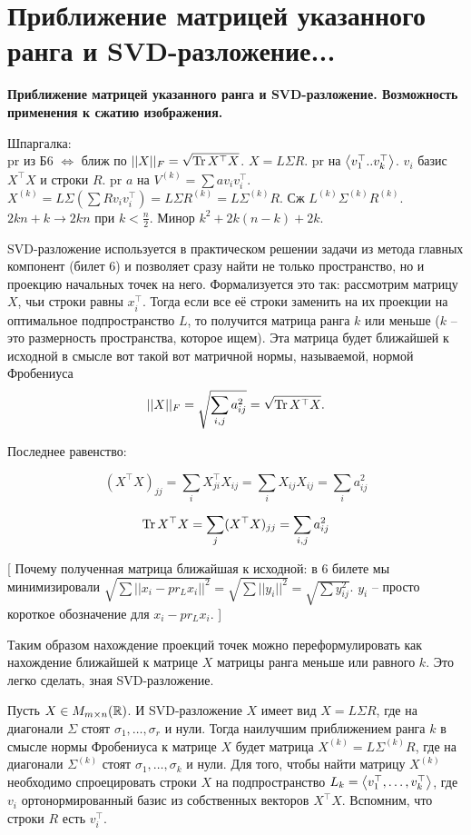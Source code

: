 \section{
 Приближение матрицей указанного ранга и SVD-разложение...
}

\textbf{Приближение матрицей указанного ранга и SVD-разложение. Возможность применения к сжатию изображения.}

Шпаргалка:\\
pr из Б6 $\Leftrightarrow$ ближ по $||X||_F = \sqrt{\operatorname{Tr} X^{\top}X}$. $X = L\Sigma R$. pr на $\left\langle v_1^{\top}..v_k^{\top} \right\rangle$. $v_i$ базис $X^{\top}X$ и строки $R$. pr $a$ на $V^{(k)} = \sum av_iv_i^{\top}$. $X^{(k)} = L\Sigma(\sum Rv_iv_i^{\top}) = L\Sigma R^{(k)} = L\Sigma^{(k)}R$. Сж $L^{(k)}\Sigma^{(k)}R^{(k)}$. $2kn +k \to 2kn$ при $k < \frac{n}{2}$. Минор $k^2 + 2k(n-k) + 2k$.

SVD-разложение используется в практическом решении задачи из метода главных компонент (билет 6) и позволяет сразу найти не только пространство, но и проекцию начальных точек на него. Формализуется это так: рассмотрим матрицу $X$, чьи строки равны $x_i^{\top}$. Тогда если все её строки заменить на их проекции на оптимальное подпространство $L$, то получится матрица ранга $k$ или меньше ($k$ -- это размерность пространства, которое ищем). Эта матрица будет ближайшей к исходной в смысле вот такой вот матричной нормы, называемой, нормой Фробениуса 
$$||X||_F=\sqrt{\sum_{i,j} a_{ij}^2}=\sqrt{\operatorname{Tr} X^{\top}X}.$$

Последнее равенство:

$$(X^{\top}X)_{jj} = \sum\limits_{i} X^{\top}_{ji}X_{ij} = \sum\limits_{i} X_{ij}X_{ij} = \sum\limits_{i} a_{ij}^2$$

$$\operatorname{Tr} X^{\top}X = \sum\limits_{j} (X^{\top}X)_{jj} = \sum\limits_{i,j} a_{ij}^2$$

[ Почему полученная матрица ближайшая к исходной: в 6 билете мы минимизировали $\sqrt{\sum ||x_i - pr_{L}x_i||^2} = \sqrt{\sum ||y_i||^2} = \sqrt{\sum y_{ij}^2}$. $y_i$ -- просто короткое обозначение для $x_i - pr_{L}x_i$. ]

Таким образом нахождение проекций точек можно переформулировать как нахождение ближайшей к матрице $X$ матрицы ранга меньше или равного $k$. Это легко сделать, зная SVD-разложение.

\thrm Пусть $X\in M_{m\times n}(\mathbb{R})$. И SVD-разложение $X$ имеет вид $X=L\Sigma R$, где на диагонали $\Sigma$ стоят $\sigma_1,\dots,\sigma_r$ и нули. Тогда наилучшим приближением ранга $k$ в смысле нормы Фробениуса к матрице $X$ будет матрица $X^{(k)}=L\Sigma^{(k)}R$, где на диагонали $\Sigma^{(k)}$ стоят $\sigma_1,\dots,\sigma_{k}$ и нули.
\proof Для того, чтобы найти матрицу $X^{(k)}$ необходимо спроецировать строки $X$ на подпространство $L_k=\left\langle v_1^{\top},\dots,v_k^{\top}\right\rangle$, где $v_i$ ортонормированный базис из собственных векторов $X^{\top}X$.  Вспомним, что строки $R$ есть $v_i^{\top}$.

